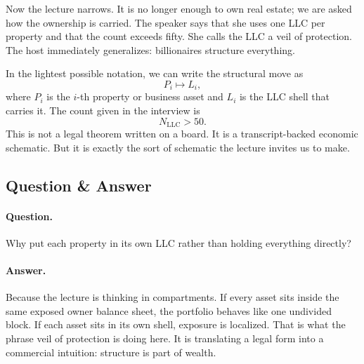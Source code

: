 Now the lecture narrows. It is no longer enough to own real estate; we are asked how the ownership is carried. The speaker says that she uses one LLC per property and that the count exceeds fifty. She calls the LLC a veil of protection. The host immediately generalizes: billionaires structure everything.

In the lightest possible notation, we can write the structural move as
\begin{equation}
P_i \mapsto L_i,
\end{equation}
where \(P_i\) is the \(i\)-th property or business asset and \(L_i\) is the LLC shell that carries it. The count given in the interview is
\begin{equation}
N_{\mathrm{LLC}} > 50.
\end{equation}
This is not a legal theorem written on a board. It is a transcript-backed economic schematic. But it is exactly the sort of schematic the lecture invites us to make.

\subsection{Question \& Answer}

\paragraph{Question.} Why put each property in its own LLC rather than holding everything directly?

\paragraph{Answer.} Because the lecture is thinking in compartments. If every asset sits inside the same exposed owner balance sheet, the portfolio behaves like one undivided block. If each asset sits in its own shell, exposure is localized. That is what the phrase veil of protection is doing here. It is translating a legal form into a commercial intuition: structure is part of wealth.

